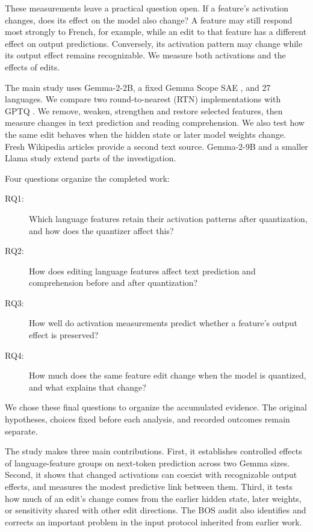 \documentclass[11pt]{article}
\begin{document}
These measurements leave a practical question open. If a feature's activation changes, does its effect on the model also change? A feature may still respond most strongly to French, for example, while an edit to that feature has a different effect on output predictions. Conversely, its activation pattern may change while its output effect remains recognizable. We measure both activations and the effects of edits.

The main study uses Gemma-2-2B, a fixed Gemma Scope SAE \citep{lieberum-etal-2024-gemma}, and 27 languages. We compare two round-to-nearest (RTN) implementations with GPTQ \citep{frantar2023gptq}. We remove, weaken, strengthen and restore selected features, then measure changes in text prediction and reading comprehension. We also test how the same edit behaves when the hidden state or later model weights change. Fresh Wikipedia articles provide a second text source. Gemma-2-9B and a smaller Llama study extend parts of the investigation.

Four questions organize the completed work:
\begin{description}
\item[RQ1:] Which language features retain their activation patterns after quantization, and how does the quantizer affect this?
\item[RQ2:] How does editing language features affect text prediction and comprehension before and after quantization?
\item[RQ3:] How well do activation measurements predict whether a feature's output effect is preserved?
\item[RQ4:] How much does the same feature edit change when the model is quantized, and what explains that change?
\end{description}
We chose these final questions to organize the accumulated evidence. The original hypotheses, choices fixed before each analysis, and recorded outcomes remain separate.

The study makes three main contributions. First, it establishes controlled effects of language-feature groups on next-token prediction across two Gemma sizes. Second, it shows that changed activations can coexist with recognizable output effects, and measures the modest predictive link between them. Third, it tests how much of an edit's change comes from the earlier hidden state, later weights, or sensitivity shared with other edit directions. The BOS audit also identifies and corrects an important problem in the input protocol inherited from earlier work.
\end{document}
